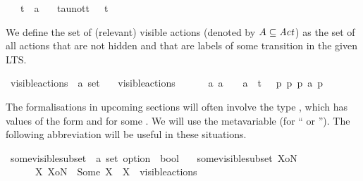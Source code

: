 \begin{isabellebody}
\ \ \ t\ {\isacharcolon}{\kern0pt}{\isacharcolon}{\kern0pt}\ {\isachardoublequoteopen}{\isacharprime}{\kern0pt}a{\isachardoublequoteclose}\isanewline
\ \ \ tau{\isacharunderscore}{\kern0pt}not{\isacharunderscore}{\kern0pt}t{\isacharcolon}{\kern0pt}\ {\isacartoucheopen}{\isasymtau}\ {\isasymnoteq}\ t{\isacartoucheclose}\isanewline
{}%
\begin{isamarkuptext}%
We define the set of (relevant) visible actions (denoted by $A \subseteq \mathit{Act}$) as the set of all actions that are not hidden and that are labels of some transition in the given LTS.%
\end{isamarkuptext}\isamarkuptrue%
\isamarkupfalse%
\ visible{\isacharunderscore}{\kern0pt}actions\ {\isacharcolon}{\kern0pt}{\isacharcolon}{\kern0pt}\ {\isacartoucheopen}{\isacharprime}{\kern0pt}a\ set{\isacartoucheclose}\isanewline
\ \ \ {\isacartoucheopen}visible{\isacharunderscore}{\kern0pt}actions\ \isanewline
\ \ \ \ {\isasymequiv}\ {\isacharbraceleft}{\kern0pt}a{\isachardot}{\kern0pt}\ {\isacharparenleft}{\kern0pt}a\ {\isasymnoteq}\ {\isasymtau}{\isacharparenright}{\kern0pt}\ {\isasymand}\ {\isacharparenleft}{\kern0pt}a\ {\isasymnoteq}\ t{\isacharparenright}{\kern0pt}\ {\isasymand}\ {\isacharparenleft}{\kern0pt}{\isasymexists}\ p\ p{\isacharprime}{\kern0pt}{\isachardot}{\kern0pt}\ p\ {\isasymlongmapsto}a\ p{\isacharprime}{\kern0pt}{\isacharparenright}{\kern0pt}{\isacharbraceright}{\kern0pt}{\isacartoucheclose}%
\begin{isamarkuptext}%
The formalisations in upcoming sections will often involve the type , which has values of the form  and  for some . We will use the metavariable  (for \enquote{ or }). The following abbreviation will be useful in these situations.%
\end{isamarkuptext}\isamarkuptrue%
\isamarkupfalse%
\ some{\isacharunderscore}{\kern0pt}visible{\isacharunderscore}{\kern0pt}subset\ {\isacharcolon}{\kern0pt}{\isacharcolon}{\kern0pt}\ {\isacartoucheopen}{\isacharprime}{\kern0pt}a\ set\ option\ {\isasymRightarrow}\ bool{\isacartoucheclose}\isanewline
\ \ \ {\isacartoucheopen}some{\isacharunderscore}{\kern0pt}visible{\isacharunderscore}{\kern0pt}subset\ XoN\ \isanewline
\ \ \ \ {\isasymequiv}\ {\isasymexists}\ X{\isachardot}{\kern0pt}\ XoN\ {\isacharequal}{\kern0pt}\ Some\ X\ {\isasymand}\ X\ {\isasymsubseteq}\ visible{\isacharunderscore}{\kern0pt}actions{\isacartoucheclose}%

\end{isabellebody}
